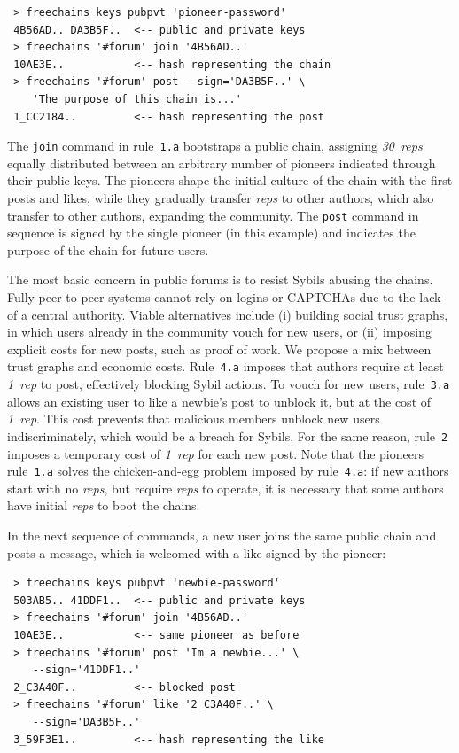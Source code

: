 \documentclass[10pt,journal,compsoc]{IEEEtran}
\newcommand{\reps}     {\emph{reps}\xspace}
\newcommand{\onerep}   {\emph{1~rep}\xspace}
\newcommand{\nreps}[1] {\emph{#1~reps\xspace}}
\newcommand{\code}[1]  {\texttt{\footnotesize{#1}}}
\begin{document}
{\footnotesize
\begin{verbatim}
 > freechains keys pubpvt 'pioneer-password'
 4B56AD.. DA3B5F..  <-- public and private keys
 > freechains '#forum' join '4B56AD..'
 10AE3E..           <-- hash representing the chain
 > freechains '#forum' post --sign='DA3B5F..' \
    'The purpose of this chain is...'
 1_CC2184..         <-- hash representing the post
\end{verbatim}
}

The \code{join} command in rule~\code{1.a} bootstraps a public chain,
assigning \nreps{30} equally distributed between an arbitrary number of
pioneers indicated through their public keys.
The pioneers shape the initial culture of the chain with the first posts and
likes, while they gradually transfer \reps to other authors, which also
transfer to other authors, expanding the community.
%
The \code{post} command in sequence is signed by the single pioneer (in this
example) and indicates the purpose of the chain for future users.

The most basic concern in public forums is to resist Sybils abusing the
chains.
Fully peer-to-peer systems cannot rely on logins or {\footnotesize CAPTCHAs}
due to the lack of a central authority.
Viable alternatives include (i) building social trust graphs, in which users
already in the community vouch for new users, or (ii) imposing explicit costs
for new posts, such as proof of work.
%
We propose a mix between trust graphs and economic costs.
%
Rule~\code{4.a} imposes that authors require at least \onerep to post,
effectively blocking Sybil actions.
To vouch for new users, rule~\code{3.a} allows an existing user to like a
newbie's post to unblock it, but at the cost of \onerep.
This cost prevents that malicious members unblock new users indiscriminately,
which would be a breach for Sybils.
For the same reason, rule~\code{2} imposes a temporary cost of \onerep for
each new post.
%
Note that the pioneers rule~\code{1.a} solves the chicken-and-egg problem
imposed by rule~\code{4.a}: if new authors start with no \reps, but require
\reps to operate, it is necessary that some authors have initial \reps to boot
the chains.

In the next sequence of commands, a new user joins the same public chain and
posts a message, which is welcomed with a like signed by the pioneer:

{\footnotesize
\begin{verbatim}
 > freechains keys pubpvt 'newbie-password'
 503AB5.. 41DDF1..  <-- public and private keys
 > freechains '#forum' join '4B56AD..'
 10AE3E..           <-- same pioneer as before
 > freechains '#forum' post 'Im a newbie...' \
    --sign='41DDF1..'
 2_C3A40F..         <-- blocked post
 > freechains '#forum' like '2_C3A40F..' \
    --sign='DA3B5F..'
 3_59F3E1..         <-- hash representing the like
\end{verbatim}
}
\end{document}
